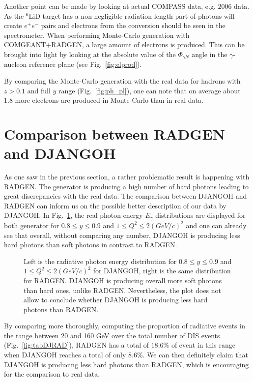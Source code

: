 Another point can be made by looking at actual COMPASS data, e.g. $2006$ data. As the $^{6}$LiD target has a non-negligible radiation length part of photons will create $e^+e^-$ pairs and electrons from the conversion should be seen in the spectrometer. When performing Monte-Carlo generation with COMGEANT+RADGEN, a large amount of electrons is produced. This can be brought into light by looking at the absolute value of the $\Phi_{\gamma N}$ angle in the $\gamma$-nucleon reference plane (see Fig.~\ref{fig:elprod}).

By comparing the Monte-Carlo generation with the real data for hadrons with $z>0.1$ and full $y$ range (Fig.~\ref{fig:ph_pl}), one can note that on average about $1.8$ more electrons are produced in Monte-Carlo than in real data.


\section{Comparison between RADGEN and DJANGOH}

As one saw in the previous section, a rather problematic result is happening with RADGEN. The generator is producing a high number of hard photons leading to great discrepancies with the real data. The comparison between DJANGOH and RADGEN can inform us on the possible better description of our data by DJANGOH. In Fig.~\ref{fig:DJRAD}, the real photon energy $E_{\gamma}$ distributions are displayed for both generator for $0.8 \leq y \leq 0.9$ and $1 \leq Q^2 \leq 2 (GeV/c)^2$ and one can already see that overall, without comparing any number, DJANGOH is producing less hard photons than soft photons in contrast to RADGEN.

\begin{figure}[htb]
\centerline{}
\caption{Left is the radiative photon energy distribution for $0.8 \leq y \leq 0.9$ and $1 \leq Q^2 \leq 2 (GeV/c)^2$ for DJANGOH, right is the same distribution for RADGEN. DJANGOH is producing overall more soft photons than hard ones, unlike RADGEN. Nevertheless, the plot does not allow to conclude whether DJANGOH is producing less hard photons than RADGEN.}\label{fig:DJRAD}
\end{figure}

By comparing more thoroughly, computing the proportion of radiative events in the range between 20 and 160 GeV over the total number of DIS events (Fig.~\ref{fig:tabDJRAD}), RADGEN has a total of $18.6$\% of event in this range when DJANGOH reaches a total of only $8.6$\%. We can then definitely claim that DJANGOH is producing less hard photons than RADGEN, which is encouraging for the comparison to real data.

